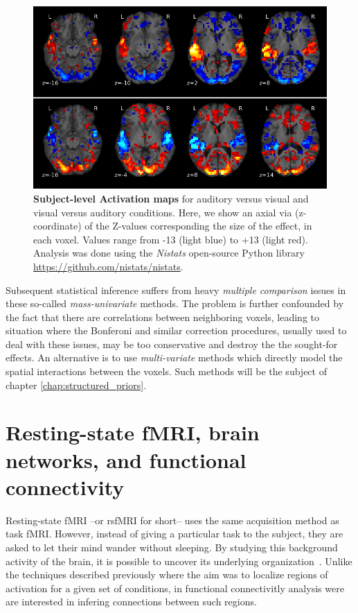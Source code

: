 \begin{figure}
  \includegraphics[width=1\linewidth]{figures/activation.png}
  \caption{\textbf{Subject-level Activation maps } for auditory versus visual and visual versus auditory conditions. Here, we show an axial via (z-coordinate) of the Z-values corresponding the size of the effect, in each voxel. Values range from -13 (light blue) to +13 (light red). Analysis was done using the \textit{Nistats} open-source Python library \url{https://github.com/nistats/nistats}.}
\end{figure}

Subsequent statistical inference suffers from heavy \textit{multiple comparison} issues in these so-called \textit{mass-univariate} methods.
%
The problem
is further confounded by the fact that there are correlations between neighboring voxels, leading to  situation where the Bonferoni and similar correction procedures, usually used to deal with these issues, may be too conservative and destroy the the sought-for effects.
%
An alternative is to use \textit{multi-variate} methods which directly model the spatial interactions between the voxels. Such methods will be the subject of chapter \ref{chap:structured_priors}.

\section{Resting-state fMRI, brain networks, and functional connectivity}
\label{sec:rsfmri}
Resting-state fMRI --or rsfMRI for short-- uses the same acquisition method as task fMRI.
However, instead of giving a particular task to the subject, they are asked to let their mind wander without sleeping. By studying this background activity of
the brain, it is possible to uncover its underlying organization~\citep{raichle10}. Unlike the techniques described previously where the aim was to localize regions of activation for a given set of conditions, in functional connectivitly analysis were are interested in infering connections between such regions.

